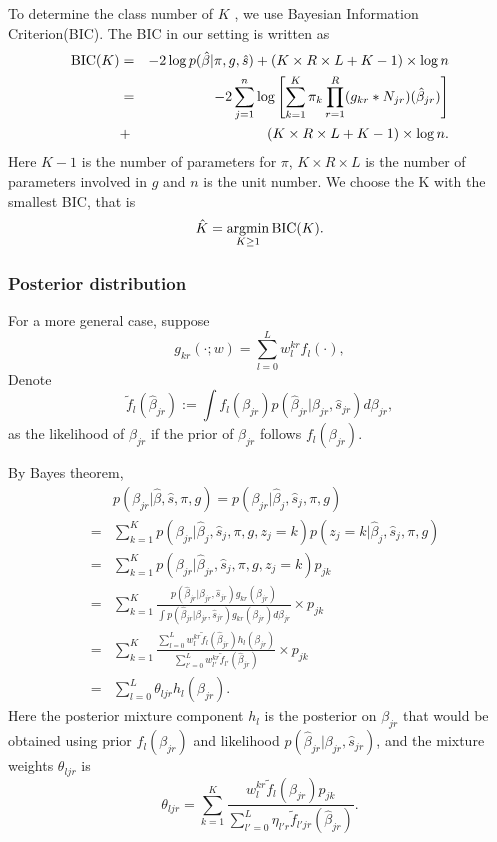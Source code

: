\documentclass[11pt]{article}
\DeclareMathOperator*{\argmin}{argmin}
\begin{document}
To determine the class number of $K$ , we use Bayesian Information Criterion(BIC). The BIC in our setting is written as 
\begin{eqnarray}
{\rm BIC}(K) &=& -2\log p(\hat\beta|\pi,g,\hat s) + (K\times R\times L+K-1)\times \log n \nonumber \\
&=& -2 \sum_{j=1}^n\log\left[\sum_{k=1}^K\pi_k\prod_{r=1}^R(g_{kr}*N_{jr})(\hat\beta_{jr})\right] \nonumber\\
&+& (K\times R\times L+K-1)\times \log n.
\end{eqnarray}
Here $K-1$ is the number of parameters for $\pi$, $K\times R\times L$ is the number of parameters involved in $g$ and $n$ is the unit number. We choose the K with the smallest BIC, that is 
\begin{equation}
\hat K = \argmin_{K\geq1} {\rm BIC}(K).
\end{equation}

\subsubsection{Posterior distribution}

For a more general case, suppose
\begin{equation}
g_{kr}(\cdot;w) = \sum_{l=0}^L w_l^{kr}f_l(\cdot),
\label{eq:geng}
\end{equation}
Denote 
\begin{equation}
     \tilde f_{l}(\hat\beta_{jr}) := \int f_l(\beta_{jr})p(\hat\beta_{jr}|\beta_{jr},\hat s_{jr})d\beta_{jr},
\end{equation}
as the likelihood of $\hat\beta_{jr}$ if the prior of $\beta_{jr}$ follows $f_l(\beta_{jr})$. 

By Bayes theorem, 
\begin{eqnarray}
&&p(\beta_{jr}|\hat\beta,\hat s,\pi, g) = p(\beta_{jr}|\hat\beta_{j},\hat s_j,\pi, g)\nonumber \\
&=& \sum_{k=1}^Kp(\beta_{jr}|\hat\beta_{j},\hat s_j,\pi,g,z_j=k)p(z_j=k|\hat\beta_{j},\hat s_j,\pi, g) \nonumber\\
&=& \sum_{k=1}^Kp(\beta_{jr}|\hat\beta_{jr},\hat s_j,\pi,g,z_j=k)p_{jk}\nonumber \\
&=& \sum_{k=1}^K\frac{p(\hat\beta_{jr}|\beta_{jr},\hat s_{jr})g_{kr}(\beta_{jr})}{\int p(\hat\beta_{jr}|\beta_{jr},\hat s_{jr})g_{kr}(\beta_{jr})d\beta_{jr}}\times p_{jk} \nonumber\\
&=& \sum_{k=1}^K \frac{\sum_{l=0}^Lw_l^{kr}\tilde f_{l}(\hat\beta_{jr})h_{l}(\beta_{jr}) }{\sum_{l'=0}^Lw_{l'}^{kr}\tilde f_{l'}(\hat\beta_{jr})} \times p_{jk} \nonumber\\
&=& \sum_{l=0}^L \theta_{ljr}h_{l}(\beta_{jr}). 
\end{eqnarray}
Here the posterior mixture component $h_l$ is the posterior on $\beta_{jr}$ that would be obtained using prior $f_l(\beta_{jr})$ and likelihood $p(\hat\beta_{jr}|\beta_{jr},\hat s_{jr})$, and the mixture weights $\theta_{ljr}$ is
\begin{equation}
     \theta_{ljr} = \sum_{k=1}^K\frac{w_{l}^{kr}\tilde f_{l}(\hat\beta_{jr})p_{jk}}{\sum_{l'=0}^L\eta_{l'r}\tilde f_{l'jr}(\hat\beta_{jr})}.
\end{equation}
\end{document}
